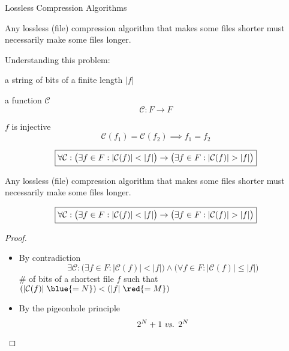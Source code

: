 \begin{frame}{}
  \centerline{\Large Lossless Compression Algorithms}
  \vspace{0.50cm}
\end{frame}

\begin{frame}{}
  \begin{theorem}
    Any lossless (file) compression algorithm that makes some files shorter must necessarily make some files longer.
  \end{theorem}

  \vspace{0.50cm}
  \pause
  Understanding this problem:
  \begin{description}
      \pause
    \item[File $f$:] a string of bits of a finite length $|f|$
      \pause
    \item[Compression Alg.:] a function $\mathcal{C}$
      \[
	\mathcal{C}: F \to F
      \]
      \vspace{-0.50cm}
      \pause
    \item[Lossless:] $f$ is injective
      \[
	\mathcal{C}(f_1) = \mathcal{C}(f_2) \implies f_1 = f_2
      \]
  \end{description}

  \vspace{-0.20cm}
  \pause
  \[
    \fbox{$\forall \mathcal{C}: \big(\exists f \in F: |\mathcal{C}(f)| < |f|\big) \to \big(\exists f \in F: |\mathcal{C}(f)| > |f|\big)$}
  \]
\end{frame}

\begin{frame}{}
  \begin{theorem}
    Any lossless (file) compression algorithm that makes some files shorter must necessarily make some files longer.
  \end{theorem}

  \[
    \fbox{$\forall \mathcal{C}: \big(\exists f \in F: |\mathcal{C}(f)| < |f|\big) \to \big(\exists f \in F: |\mathcal{C}(f)| > |f|\big)$}
  \]
  
  \begin{proof}
    \begin{itemize} 
	\pause
      \item By contradiction
	\pause
	\[
	  \exists \mathcal{C}: \big(\exists f \in F: |\mathcal{C}(f)| < |f|\big) \land \big(\forall f \in F: |\mathcal{C}(f)| \le |f| \big)
	\]
        \pause
	 \# of bits of a shortest file $f$ such that $(|\mathcal{C}(f)| \;\blue{= N}) < (|f| \;\red{= M})$
	\pause
      \item By the pigeonhole principle
	\[
	  2^N + 1 \;\text{\it vs. } 2^N
	\]
    \end{itemize}
  \end{proof}
\end{frame}
